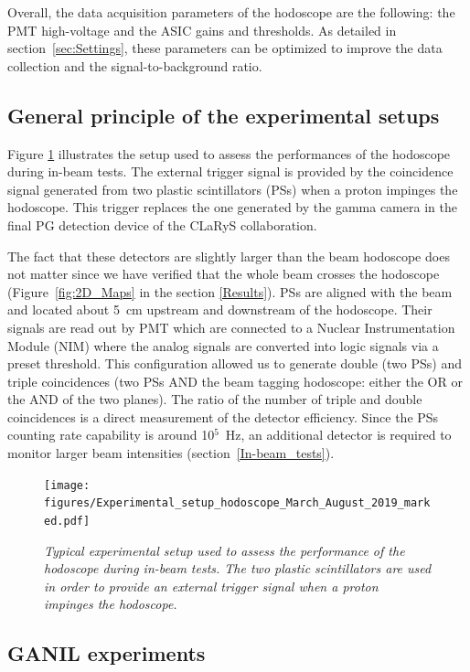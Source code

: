 \documentclass[a4paper,11pt]{article}
\begin{document}
Overall, the data acquisition parameters of the hodoscope are the following: the PMT high-voltage and the ASIC gains and thresholds. As detailed in section~\ref{sec:Settings}, these parameters can be optimized to improve the data collection and the signal-to-background ratio.


\subsection{General principle of the experimental setups}
\label{GeneralPrinc}

Figure \ref{fig:Picture_Setup_hodo} illustrates the setup used to assess the performances of the hodoscope during in-beam tests. The external trigger signal is provided by the coincidence signal generated from two plastic scintillators (PSs) when a proton impinges the hodoscope. This trigger replaces the one generated by the gamma camera in the final PG detection device of the CLaRyS collaboration.

The fact that these detectors are slightly larger than the beam hodoscope does not matter since we have verified that the whole beam crosses the hodoscope (Figure~\ref{fig:2D_Maps} in the section \ref{Results}). PSs are aligned with the beam and located about 5~cm upstream and downstream of the hodoscope. Their signals are read out by PMT which are connected to a Nuclear Instrumentation Module (NIM) where the analog signals are converted into logic signals via a preset threshold. This configuration allowed us to generate double (two PSs) and triple coincidences (two PSs AND the beam tagging hodoscope: either the OR or the AND of the two planes). The ratio of the number of triple and double coincidences is a direct measurement of the detector efficiency. Since the PSs counting rate capability is around {10}$^{5}$~Hz, an additional detector is required to monitor larger beam intensities (section~\ref{In-beam_tests}).

\begin{figure}[htb]
\centering
\texttt{[image: figures/Experimental\_setup\_hodoscope\_March\_August\_2019\_marked.pdf]}
\caption{\small{\textit{Typical experimental setup used to assess the performance of the hodoscope during in-beam tests. The two plastic scintillators are used in order to provide an external trigger signal when a proton impinges the hodoscope.}}}
\label{fig:Picture_Setup_hodo}
\end{figure}


\subsection{GANIL experiments}
\end{document}
